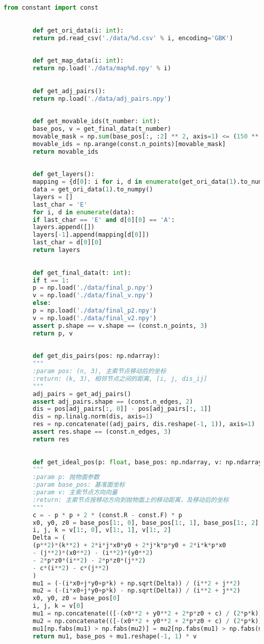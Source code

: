 \documentclass[withoutpreface,bwprint,fontset=macnew]{cumcmthesis} %
\begin{document}
\begin{appendices}
\begin{lstlisting}[language=python]
		from constant import const
		
		
		def get_ori_data(i: int):
		return pd.read_csv('./data/%d.csv' % i, encoding='GBK')
		
		
		def get_map_data(i: int):
		return np.load('./data/map%d.npy' % i)
		
		
		def get_adj_pairs():
		return np.load('./data/adj_pairs.npy')
		
		
		def get_movable_ids(t_number: int):
		base_pos, v = get_final_data(t_number)
		movable_mask = np.sum(base_pos[:, :2] ** 2, axis=1) <= (150 ** 2)
		movable_ids = np.arange(const.n_points)[movable_mask]
		return movable_ids
		
		
		def get_layers():
		mapping = {d[0]: i for i, d in enumerate(get_ori_data(1).to_numpy())}
		data = get_ori_data(1).to_numpy()
		layers = []
		last_char = 'E'
		for i, d in enumerate(data):
		if last_char == 'E' and d[0][0] == 'A':
		layers.append([])
		layers[-1].append(mapping[d[0]])
		last_char = d[0][0]
		return layers
		
		
		def get_final_data(t: int):
		if t == 1:
		p = np.load('./data/final_p.npy')
		v = np.load('./data/final_v.npy')
		else:
		p = np.load('./data/final_p2.npy')
		v = np.load('./data/final_v2.npy')
		assert p.shape == v.shape == (const.n_points, 3)
		return p, v
		
		
		def get_dis_pairs(pos: np.ndarray):
		"""
		:param pos: (n, 3), 主索节点移动后的坐标
		:return: (k, 3), 相邻节点之间的距离, [i, j, dis_ij]
		"""
		adj_pairs = get_adj_pairs()
		assert adj_pairs.shape == (const.n_edges, 2)
		dis = pos[adj_pairs[:, 0]] - pos[adj_pairs[:, 1]]
		dis = np.linalg.norm(dis, axis=1)
		res = np.concatenate((adj_pairs, dis.reshape(-1, 1)), axis=1)
		assert res.shape == (const.n_edges, 3)
		return res
		
		
		def get_ideal_pos(p: float, base_pos: np.ndarray, v: np.ndarray):
		"""
		:param p: 抛物面参数
		:param base_pos: 基准面坐标
		:param v: 主索节点方向向量
		:return: 主索节点按移动方向到抛物面上的移动距离，及移动后的坐标
		"""
		c = - p * p + 2 * (const.R - const.F) * p
		x0, y0, z0 = base_pos[1:, 0], base_pos[1:, 1], base_pos[1:, 2]
		i, j, k = v[1:, 0], v[1:, 1], v[1:, 2]
		Delta = (
		(p**2)*(k**2) + 2*i*j*x0*y0 + 2*j*k*p*y0 + 2*i*k*p*x0
		- (j**2)*(x0**2) - (i**2)*(y0**2)
		- 2*p*z0*(i**2) - 2*p*z0*(j**2)
		- c*(i**2) - c*(j**2)
		)
		mu1 = (-(i*x0+j*y0+p*k) + np.sqrt(Delta)) / (i**2 + j**2)
		mu2 = (-(i*x0+j*y0+p*k) - np.sqrt(Delta)) / (i**2 + j**2)
		x0, y0, z0 = base_pos[0]
		i, j, k = v[0]
		mu1 = np.concatenate(([-(x0**2 + y0**2 + 2*p*z0 + c) / (2*p*k)], mu1))
		mu2 = np.concatenate(([-(x0**2 + y0**2 + 2*p*z0 + c) / (2*p*k)], mu2))
		mu1[np.fabs(mu1) > np.fabs(mu2)] = mu2[np.fabs(mu1) > np.fabs(mu2)]
		return mu1, base_pos + mu1.reshape(-1, 1) * v
		

\end{lstlisting}
\end{appendices}
\end{document}
